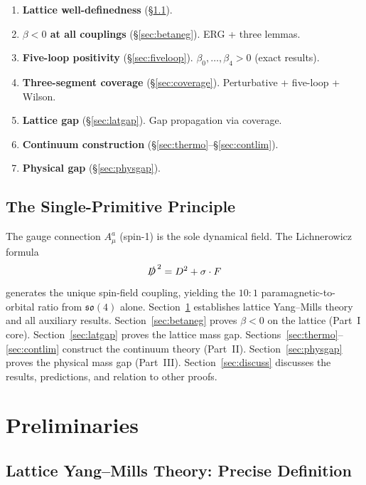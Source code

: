 \documentclass[12pt,a4paper]{article}
\theoremstyle{plain}
\theoremstyle{definition}
\theoremstyle{remark}
\begin{document}
\begin{enumerate}[label=\textbf{S\arabic*},leftmargin=3em]
\item \textbf{Lattice well-definedness} (\S\ref{sec:lattice}).
\item \textbf{$\beta<0$ at all couplings} (\S\ref{sec:betaneg}). ERG + three lemmas.
\item \textbf{Five-loop positivity} (\S\ref{sec:fiveloop}). $\beta_0,\ldots,\beta_4>0$ (exact results).
\item \textbf{Three-segment coverage} (\S\ref{sec:coverage}). Perturbative + five-loop + Wilson.
\item \textbf{Lattice gap} (\S\ref{sec:latgap}). Gap propagation via coverage.
\item \textbf{Continuum construction} (\S\ref{sec:thermo}--\S\ref{sec:contlim}).
\item \textbf{Physical gap} (\S\ref{sec:physgap}).
\end{enumerate}

\subsection{The Single-Primitive Principle}\label{sec:primitive}

The gauge connection $A_\mu^a$ (spin-1) is the sole dynamical field. The Lichnerowicz formula
\begin{equation}\label{eq:Lich}
\slashed{D}^{\,2}=D^2+\sigma\cdot F
\end{equation}
generates the unique spin-field coupling, yielding the $10{:}1$ paramagnetic-to-orbital ratio from $\mathfrak{so}(4)$ alone.
Section~\ref{sec:prelim} establishes lattice Yang--Mills theory and all auxiliary results. Section~\ref{sec:betaneg} proves $\beta<0$ on the lattice (Part~I core). Section~\ref{sec:latgap} proves the lattice mass gap. Sections~\ref{sec:thermo}--\ref{sec:contlim} construct the continuum theory (Part~II). Section~\ref{sec:physgap} proves the physical mass gap (Part~III). Section~\ref{sec:discuss} discusses the results, predictions, and relation to other proofs.

\section{Preliminaries}\label{sec:prelim}

\subsection{Lattice Yang--Mills Theory: Precise Definition}\label{sec:lattice}
\end{document}
